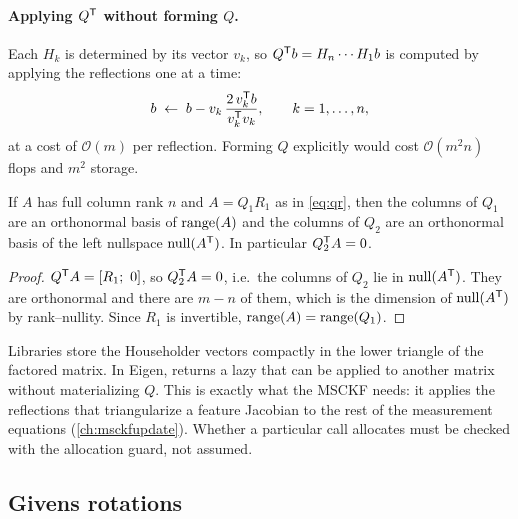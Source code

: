 \paragraph{Applying $Q^{\mathsf{T}}$ without forming $Q$.} Each $H_k$ is determined by its vector $v_k$, so $Q^{\mathsf{T}} b = H_n\cdots H_1b$ is computed by
applying the reflections one at a time:
\begin{equation}
  b \;\gets\; b - v_k\,\frac{2\,v_k^{\mathsf{T}} b}{v_k^{\mathsf{T}} v_k}, \qquad k = 1, \dots, n,
\end{equation}
at a cost of $\mathcal{O}(m)$ per reflection. Forming $Q$ explicitly would cost $\mathcal{O}(m^2n)$ flops and $m^2$ storage.

\begin{proposition}
\label{prop:qr-nullspace}
If $A$ has full column rank $n$ and $A = Q_1 R_1$ as in \eqref{eq:qr}, then the columns of $Q_1$ are an orthonormal basis of
$\operatorname{range}(A)$ and the columns of $Q_2$ are an orthonormal basis of the left nullspace $\operatorname{null}(A^{\mathsf{T}})$. In particular $Q_2^{\mathsf{T}} A = 0$.
\end{proposition}
\begin{proof}
$Q^{\mathsf{T}} A = [R_1;\ 0]$, so $Q_2^{\mathsf{T}} A = 0$, i.e.\ the columns of $Q_2$ lie in $\operatorname{null}(A^{\mathsf{T}})$. They are orthonormal and there are $m - n$ of them,
which is the dimension of $\operatorname{null}(A^{\mathsf{T}})$ by rank--nullity. Since $R_1$ is invertible, $\operatorname{range}(A) = \operatorname{range}(Q_1)$.
\end{proof}

\begin{implnote}
Libraries store the Householder vectors compactly in the lower triangle of the factored matrix. In Eigen,
 returns a lazy  that can be applied to another matrix without
materializing $Q$. This is exactly what the MSCKF needs: it applies the reflections that triangularize a feature Jacobian to the
rest of the measurement equations (\cref{ch:msckfupdate}). Whether a particular call allocates must be checked with the allocation
guard, not assumed.
\end{implnote}

\subsection{Givens rotations}

